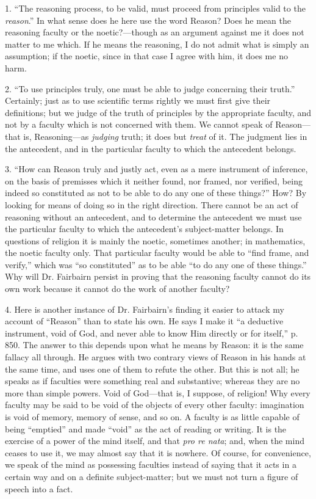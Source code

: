 1. ``The reasoning process, to be valid, must
proceed from principles valid to the \emph{reason}.'' In what
sense does he here use the word Reason? Does he mean the reasoning
faculty or the noetic?—though as an argument against me it does not
matter to me which. If he means the reasoning, I do not admit what is
simply an assumption; if the noetic, since in that case I agree with
him, it does me no harm.

2. ``To use principles truly, one must be able to
judge concerning their truth.'' Certainly; just as to use scientific
terms rightly we must first give their definitions; but we judge of
the truth of principles by the appropriate faculty, and not by a
faculty which is not concerned with them. We cannot speak of
Reason—that is, Reasoning—as \emph{judging} truth; it does but \emph{treat}
of it. The judgment lies in the antecedent, and in the particular
faculty to which the antecedent belongs.

3. ``How can Reason truly and justly act, even as
a mere instrument of inference, on the basis of premisses which it
neither found, nor framed, nor verified, being indeed so
constituted as not to be able to do any one of these things?'' How? By
looking for means of doing so in the right direction. There cannot be
an act of reasoning without an antecedent, and to determine the
antecedent we must use the particular faculty to which the antecedent's
subject-matter belongs. In questions of religion it is mainly the
noetic, sometimes another; in mathematics, the noetic faculty only.
That particular faculty would be able to ``find frame, and verify,''
which was ``so constituted'' as to be able ``to do any one of these
things.'' Why will Dr. Fairbairn persist in proving that the reasoning
faculty cannot do its own work because it cannot do the work of
another faculty?

4. Here is another instance of Dr. Fairbairn's
finding it easier to attack my account of ``Reason'' than to state his
own. He says I make it ``a deductive instrument, void of God, and never
able to know Him directly or for itself,'' p. 850. The answer to this
depends upon what he means by Reason: it is the same fallacy all
through. He argues with two contrary views of Reason in his hands at
the same time, and uses one of them to refute the other. But this is
not all; he speaks as if faculties were something real and
substantive; whereas they are no more than simple powers. Void of
God—that is, I suppose, of religion! Why every faculty may be said
to be void of the objects of every other faculty: imagination is void
of memory, memory of sense, and so on. A faculty is as little
capable of being ``emptied'' and made ``void'' as the act of reading or
writing. It is the exercise of a power of the mind itself, and that \emph{pro
re nata}; and, when the mind ceases to use it, we may almost say
that it is nowhere. Of course, for convenience, we speak of the mind
as possessing faculties instead of saying that it acts in a certain
way and on a definite subject-matter; but we must not turn a figure of
speech into a fact.


